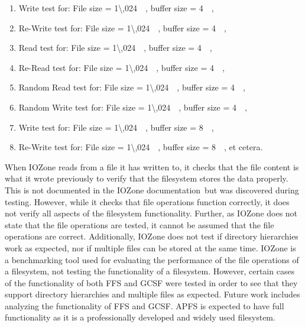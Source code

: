 \begin{enumerate}
	\item Write test for: File size = \SI{1\,024}{\kilo\byte}, buffer size = \SI{4}{\kilo\byte},
	\item \mbox{Re-Write} test for: File size = \SI{1\,024}{\kilo\byte}, buffer size = \SI{4}{\kilo\byte},
	\item Read test for: File size = \SI{1\,024}{\kilo\byte}, buffer size = \SI{4}{\kilo\byte},
	\item \mbox{Re-Read} test for: File size = \SI{1\,024}{\kilo\byte}, buffer size = \SI{4}{\kilo\byte},
	\item Random Read test for: File size = \SI{1\,024}{\kilo\byte}, buffer size = \SI{4}{\kilo\byte},
	\item Random Write test for: File size = \SI{1\,024}{\kilo\byte}, buffer size = \SI{4}{\kilo\byte},
	\item Write test for: File size = \SI{1\,024}{\kilo\byte}, buffer size = \SI{8}{\kilo\byte},
	\item \mbox{Re-Write} test for: File size = \SI{1\,024}{\kilo\byte}, buffer size = \SI{8}{\kilo\byte}, et cetera.
\end{enumerate}

When IOZone reads from a file it has written to, it checks that the file content is what it wrote previously to verify that the filesystem stores the data properly. This is not documented in the IOZone documentation\,\cite{iozoneIozoneFilesystemBenchmark} but was discovered during testing. However, while it checks that file operations function correctly, it does not verify all aspects of the filesystem functionality. Further, as IOZone does not state that the file operations are tested, it cannot be assumed that the file operations are correct. Additionally, IOZone does not test if directory hierarchies work as expected, nor if multiple files can be stored at the same time. IOZone is a benchmarking tool used for evaluating the performance of the file operations of a filesystem, not testing the functionality of a filesystem. However, certain cases of the functionality of both \gls{FFS} and \gls{GCSF} were tested in order to see that they support directory hierarchies and multiple files as expected. Future work includes analyzing the functionality of \gls{FFS} and \gls{GCSF}. \gls{APFS} is expected to have full functionality as it is a professionally developed and widely used filesystem.

